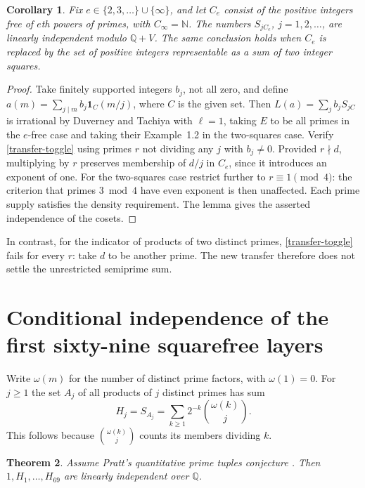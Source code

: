 \documentclass[11pt,letterpaper]{article}
\newtheorem{theorem}{Theorem}[section]
\newtheorem{corollary}[theorem]{Corollary}
\begin{document}
\begin{corollary}\label{cor:rfreesparse}
Fix $e\in\{2,3,\ldots\}\cup\{\infty\}$, and let $C_e$ consist of the
positive integers free of $e$th powers of primes, with $C_\infty=\mathbb N$.
The numbers $S_{jC_e}$, $j=1,2,\ldots$, are linearly independent modulo
$\mathbb Q+V$. The same conclusion holds when $C_e$ is replaced by the
set of positive integers representable as a sum of two integer squares.
\end{corollary}
\begin{proof}
Take finitely supported integers $b_j$, not all zero, and define
$a(m)=\sum_{j\mid m}b_j\mathbf1_C(m/j)$, where $C$ is the given set.
Then $L(a)=\sum_j b_j S_{jC}$ is irrational by Duverney and Tachiya \cite[Corollary~1.2]{duverney} with
 $\ell=1$, taking $E$ to be all primes in the
$e$-free case and taking their Example~1.2 in the two-squares case.
Verify \eqref{transfer-toggle} using primes $r$ not dividing any $j$
with $b_j\ne0$. Provided $r\nmid d$, multiplying by $r$ preserves
membership of $d/j$ in $C_e$, since it introduces an exponent of one.
For the two-squares case restrict further to $r\equiv1\pmod4$: the
criterion that primes $3\bmod4$ have even exponent is then unaffected.
Each prime supply satisfies the density requirement. The lemma gives
the asserted independence of the cosets.
\end{proof}

In contrast, for the indicator of products of two distinct primes,
\eqref{transfer-toggle} fails for every $r$: take $d$ to be another
prime. The new transfer therefore does not settle the unrestricted
semiprime sum.


\section{Conditional independence of the first sixty-nine squarefree layers}
\label{sec:pratt69}
Write $\omega(m)$ for the number of distinct prime factors, with
$\omega(1)=0$. For $j\ge1$ the set $A_j$ of all products of $j$
distinct primes has sum
\[
 H_j=S_{A_j}=\sum_{k\ge1}2^{-k}\binom{\omega(k)}{j}.
\]
This follows because $\binom{\omega(k)}{j}$ counts its members dividing $k$.

\begin{theorem}\label{th:pratt69}
Assume Pratt's quantitative prime tuples conjecture
\cite[Conjecture~1.2]{pratt}. Then $1,H_1,\ldots,H_{69}$
are linearly independent over $\mathbb Q$.
\end{theorem}
\end{document}
